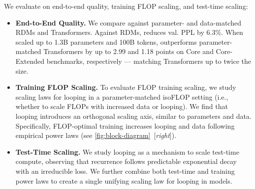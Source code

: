 We evaluate \sysname on end-to-end quality, training FLOP scaling, and test-time scaling:
\begin{itemize}[itemsep=0pt,topsep=0pt,leftmargin=*]
    \item\textbf{End-to-End Quality.} We compare \sysname against parameter- and data-matched RDMs \citep{geiping_scaling_2025} and Transformers. Against RDMs, \sysname reduces val. PPL by 6.3\%. When scaled up to 1.3B parameters and 100B tokens, \sysname outperforms parameter-matched Transformers by up to 2.99 and 1.18 points on Core and Core-Extended \citep{li2025datacomplmsearchgenerationtraining} benchmarks, respectively --- matching Transformers up to twice the size. 
    \item\textbf{Training FLOP Scaling.} To evaluate FLOP training scaling, we study scaling laws for looping in a parameter-matched isoFLOP setting (i.e., whether to scale FLOPs with increased data or looping).
    We find that looping introduces an orthogonal scaling axis, similar to parameters and data.
    Specifically, FLOP-optimal training increases looping and data following empirical power laws (see \cref{fig:block-diagram}~[\emph{right}]). 
    \item\textbf{Test-Time Scaling.} We study looping as a mechanism to scale test-time compute, observing that recurrence follows predictable exponential decay with an irreducible loss. We further combine both test-time and training power laws to create a single unifying scaling law for looping in \sysname models.
\end{itemize}





